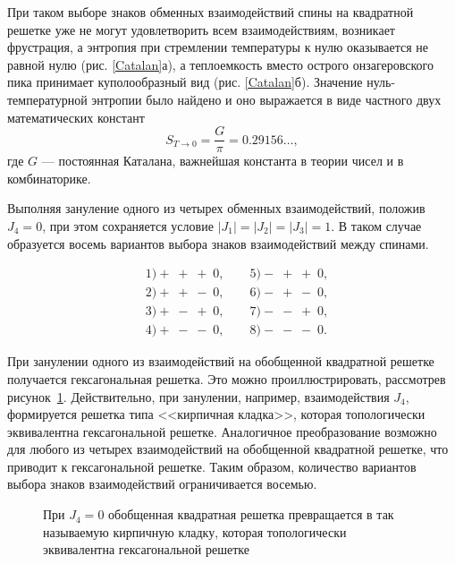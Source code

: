 \documentclass[utf8,12pt]{jetp}
\begin{document}
При таком выборе знаков обменных взаимодействий спины на квадратной решетке уже не могут удовлетворить всем взаимодействиям, возникает фрустрация, а энтропия при стремлении температуры к нулю оказывается не равной нулю (рис. \ref{Catalan}а), а теплоемкость вместо острого онзагеровского пика принимает куполообразный вид (рис. \ref{Catalan}б). Значение нуль-температурной энтропии было найдено и оно выражается в виде частного двух математических констант
\begin{equation}
S_{T\rightarrow 0} = \frac{G}{\pi} = 0.29156\dots,
\label{g}
\end{equation} 
где $G$ --- постоянная Каталана, важнейшая константа в теории чисел и в комбинаторике.

Выполняя зануление одного из четырех обменных взаимодействий, положив $J_4 = 0$, при этом сохраняется условие $|J_1| = |J_2| = |J_3| = 1$. В таком случае образуется восемь вариантов выбора знаков взаимодействий между спинами.

\begin{align*}
	&1) +\;+\;+\;0, \qquad   5) -\;+\;+\;0, \\
	&2) +\;+\;-\;0, \qquad  6) -\;+\;-\;0, \\
	&3) +\;-\;+\;0, \qquad  7) -\;-\;+\;0, \\
	&4) +\;-\;-\;0, \qquad  8) -\;-\;-\;0.
\end{align*}

При занулении одного из взаимодействий на обобщенной квадратной решетке получается гексагональная решетка. Это можно проиллюстрировать, рассмотрев рисунок~\ref{hexTranf}. Действительно, при занулении, например, взаимодействия $J_4$, формируется решетка типа <<кирпичная кладка>>, которая топологически эквивалентна гексагональной решетке. Аналогичное преобразование возможно для любого из четырех взаимодействий на обобщенной квадратной решетке, что приводит к гексагональной решетке. Таким образом, количество вариантов выбора знаков взаимодействий ограничивается восемью.

\begin{figure}[h]
	\caption{При $J_4 = 0$ обобщенная квадратная решетка превращается в так называемую кирпичную кладку, которая топологически эквивалентна гексагональной решетке}
	\label{hexTranf}
\end{figure}
\end{document}
